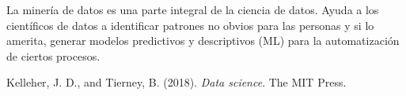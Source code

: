 \documentclass[12pt]{article}
\begin{document}
La minería de datos es una parte integral de la ciencia de datos. Ayuda a los científicos de datos a identificar patrones no obvios para las personas y si lo amerita, generar modelos predictivos y descriptivos (ML) para la automatización de ciertos procesos.\\

\begin{thebibliography}{a}

Kelleher, J. D., and Tierney, B. (2018). \emph{Data science}. The MIT Press.

\end{thebibliography}
\end{document}

